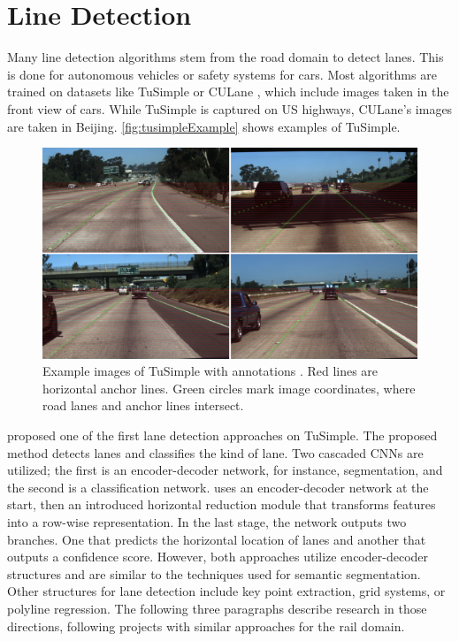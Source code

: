 \section{Line Detection}
\label{sec:lineDetection}

Many line detection algorithms stem from the road domain to detect lanes.
This is done for autonomous vehicles or safety systems for cars.
Most algorithms are trained on datasets like TuSimple \cite{tuSimpleDataset} or CULane \cite{cuLaneDataset}, which include images taken in the front view of cars.
While TuSimple is captured on US highways, CULane's images are taken in Beijing.
\autoref{fig:tusimpleExample} shows examples of TuSimple.

\vspace{0.8cm}

\begin{figure}[H]
    \centering
    \includegraphics[width=\linewidth]{PICs/lineDetection/tusimple_example.jpg}
    \caption{Example images of TuSimple with annotations \cite{tuSimpleDatasetExampleImage}. Red lines are horizontal anchor lines. Green circles mark image coordinates, where road lanes and anchor lines intersect.}
    \label{fig:tusimpleExample}
\end{figure}

\vspace{0.8cm}

\noindent \cite{LaneDetectionCascadedCNNs2019} proposed one of the first lane detection approaches on TuSimple.
The proposed method detects lanes and classifies the kind of lane.
Two cascaded \ac{CNN}s are utilized; the first is an encoder-decoder network, for instance, segmentation, and the second is a classification network.
\cite{rowwiseClassification2020} uses an encoder-decoder network at the start, then an introduced horizontal reduction module that transforms features into a row-wise representation. In the last stage, the network outputs two branches. One that predicts the horizontal location of lanes and another that outputs a confidence score.
However, both approaches utilize encoder-decoder structures and are similar to the techniques used for semantic segmentation.
Other structures for lane detection include key point extraction, grid systems, or polyline regression.
The following three paragraphs describe research in those directions, following projects with similar approaches for the rail domain.

